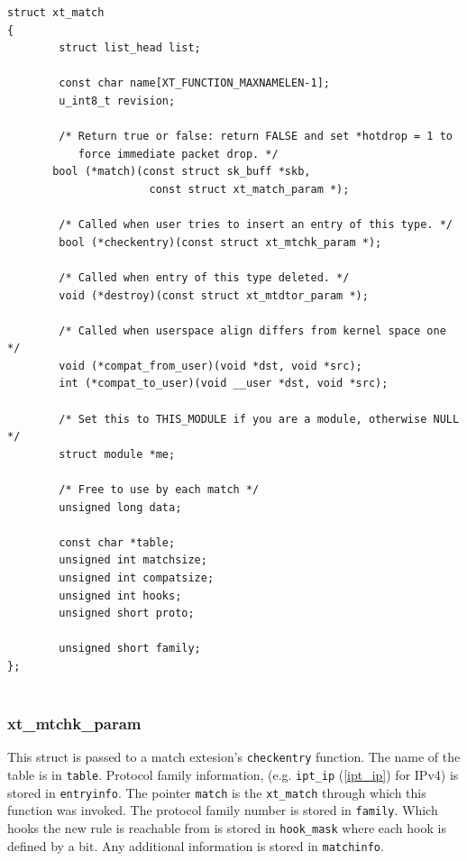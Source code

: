 \documentclass[a4paper,10pt]{article}
\newcommand{\code}[1]{\texttt{#1}}
\begin{document}
\begin{lstlisting}
struct xt_match
{
        struct list_head list;

        const char name[XT_FUNCTION_MAXNAMELEN-1];
        u_int8_t revision;

        /* Return true or false: return FALSE and set *hotdrop = 1 to                                                                                       
           force immediate packet drop. */
       bool (*match)(const struct sk_buff *skb,
                      const struct xt_match_param *);

        /* Called when user tries to insert an entry of this type. */
        bool (*checkentry)(const struct xt_mtchk_param *);

        /* Called when entry of this type deleted. */
        void (*destroy)(const struct xt_mtdtor_param *);

        /* Called when userspace align differs from kernel space one */
        void (*compat_from_user)(void *dst, void *src);
        int (*compat_to_user)(void __user *dst, void *src);

        /* Set this to THIS_MODULE if you are a module, otherwise NULL */
        struct module *me;

        /* Free to use by each match */
        unsigned long data;

        const char *table;
        unsigned int matchsize;
        unsigned int compatsize;
        unsigned int hooks;
        unsigned short proto;

        unsigned short family;
};
        
\end{lstlisting}

\subsubsection{xt\_mtchk\_param}\label{xt_mtchk_param}

This struct is passed to a match extesion's \code{checkentry}
function. The name of the table is in \code{table}. Protocol family
information, (e.g. \code{ipt\_ip} (\ref{ipt_ip}) for IPv4) is stored
in \code{entryinfo}.  The pointer \code{match} is the \code{xt\_match}
through which this function was invoked. The protocol family number is
stored in \code{family}.  Which hooks the new rule is reachable from
is stored in \code{hook\_mask} where each hook is defined by a
bit. Any additional information is stored in \code{matchinfo}.
\end{document}

